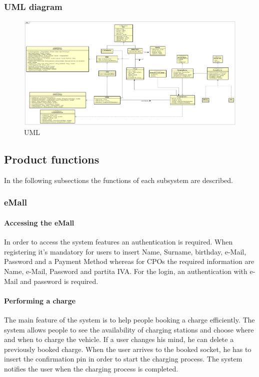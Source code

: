 \subsubsection{UML diagram}
\begin{figure}[h!]
      \begin{center}
            \includegraphics[keepaspectratio, width=16cm]{UML.png}
            \caption{UML}
      \end{center}
\end{figure}

\subsection{Product functions}
In the following subsections the functions of each subsystem are described.

\subsubsection{\ac{eMall}}
\paragraph{Accessing the \ac{eMall}}
In order to access the system features an authentication is required. When registering it's mandatory for users to insert Name, Surname, birthday, e-Mail, Password and a Payment Method whereas for \acp{CPO} the required information are Name, e-Mail, Password and \gls{partita IVA}. For the login, an authentication with e-Mail and password is required.

\paragraph{Performing a charge}
The main feature of the system is to help people booking a charge efficiently. The system allows people to see the availability of charging stations and choose where and when to charge the vehicle.
If a user changes his mind, he can delete a previously booked charge.
When the user arrives to the booked socket, he has to insert the confirmation pin in order to start the charging process.
The system notifies the user when the charging process is completed.

